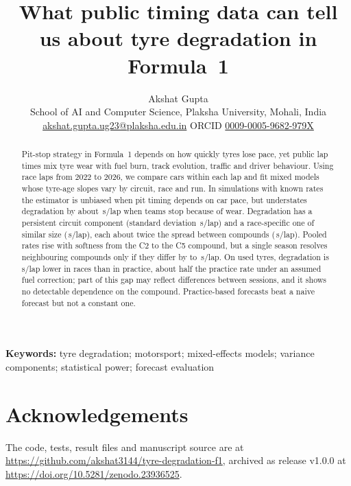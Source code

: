 \documentclass[11pt]{article}
\title{What public timing data can tell us about tyre degradation in Formula~1}
\author{Akshat Gupta\\[2pt]
  \small School of AI and Computer Science, Plaksha University, Mohali, India\\
  \small \href{mailto:akshat.gupta.ug23@plaksha.edu.in}{akshat.gupta.ug23@plaksha.edu.in}\quad
  ORCID \href{https://orcid.org/0009-0005-9682-979X}{0009-0005-9682-979X}}
\date{}
\newcommand{\spl}{\,s/lap}
\newcommand{\ZenodoNote}{, archived as release v1.0.0 at \url{https://doi.org/10.5281/zenodo.23936525}}
\begin{document}
\maketitle

\begin{abstract}\noindent
Pit-stop strategy in Formula~1 depends on how quickly tyres lose pace, yet public lap times mix tyre wear with fuel burn, track evolution, traffic and driver behaviour. Using \PooledNLaps{} race laps from 2022 to 2026, we compare cars within each lap and fit mixed models whose tyre-age slopes vary by circuit, race and run. In simulations with known rates the estimator is unbiased when pit timing depends on car pace, but understates degradation by about \RecExactWearBiasAbs\spl{} when teams stop because of wear. Degradation has a persistent circuit component (standard deviation \PersistSDAbs\spl) and a race-specific one of similar size (\EventSDAbs\spl), each about twice the spread between compounds (\PooledCompoundSDAbs\spl). Pooled rates rise with softness from the C2 to the C5 compound, but a single season resolves neighbouring compounds only if they differ by \SixMDEFourThree{} to \SixMDETwoOne\spl. On used tyres, degradation is \LevelGapMSAbs\spl{} lower in races than in practice, about half the practice rate under an assumed fuel correction; part of this gap may reflect differences between sessions, and it shows no detectable dependence on the compound. Practice-based forecasts beat a naive forecast but not a constant one.
\end{abstract}
\noindent\textbf{Keywords:} tyre degradation; motorsport; mixed-effects models; variance components; statistical power; forecast evaluation







\section*{Acknowledgements}
The code, tests, result files and manuscript source are at \url{https://github.com/akshat3144/tyre-degradation-f1}\ZenodoNote.
\end{document}
